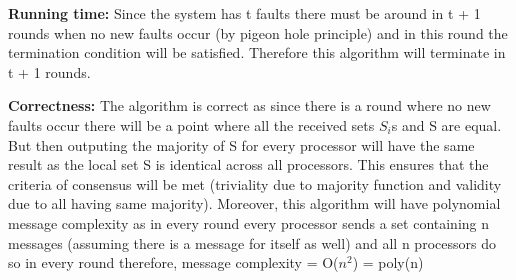 \documentclass[11pt]{article}
\newcommand\correctness{\vspace{.10in}\textbf{Correctness: }\newline}
\newcommand\runtime{\vspace{.10in}\textbf{Running time: }\newline}
\begin{document}
\runtime
Since the system has t faults there must be around in t + 1 rounds when no new faults occur (by pigeon hole principle) and in this round the termination condition will be satisfied. Therefore this algorithm will terminate in t + 1 rounds.

\correctness
The algorithm is correct as since there is a round where no new faults occur there will be a point where all the received sets $S_i$s and S are equal. But then outputing the majority of S for every processor will have the same result as the local set S is identical across all processors. This ensures that the criteria of consensus will be met (triviality due to majority function and validity due to all having same majority). Moreover, this algorithm will have polynomial message complexity as in every round every processor sends a set containing n messages (assuming there is a message for itself as well) and all n processors do so in every round therefore, message complexity = O($n^2$) = poly(n)
\end{document}
